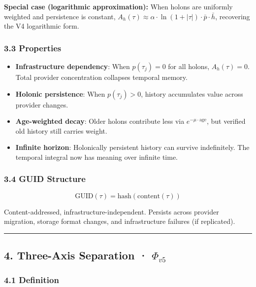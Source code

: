 \documentclass[
  11pt,
]{article}
\providecommand{\tightlist}{%
  \setlength{\itemsep}{0pt}\setlength{\parskip}{0pt}}
\begin{document}
\textbf{Special case (logarithmic approximation):} When holons are
uniformly weighted and persistence is constant,
\(A_h(\tau) \approx \alpha \cdot \ln(1 + |\tau|) \cdot \bar{p} \cdot \bar{h}\),
recovering the V4 logarithmic form.

\subsubsection{3.3 Properties}\label{properties}

\begin{itemize}
\tightlist
\item
  \textbf{Infrastructure dependency}: When \(p(\tau_j) = 0\) for all
  holons, \(A_h(\tau) = 0\). Total provider concentration collapses
  temporal memory.
\item
  \textbf{Holonic persistence}: When \(p(\tau_j) > 0\), history
  accumulates value across provider changes.
\item
  \textbf{Age-weighted decay}: Older holons contribute less via
  \(e^{-\mu \cdot \text{age}}\), but verified old history still carries
  weight.
\item
  \textbf{Infinite horizon}: Holonically persistent history can survive
  indefinitely. The temporal integral now has meaning over infinite
  time.
\end{itemize}

\subsubsection{3.4 GUID Structure}\label{guid-structure}

\[\text{GUID}(\tau) = \text{hash}(\text{content}(\tau))\]

Content-addressed, infrastructure-independent. Persists across provider
migration, storage format changes, and infrastructure failures (if
replicated).

\begin{center}\rule{0.5\linewidth}{0.5pt}\end{center}

\subsection{\texorpdfstring{4. Three-Axis Separation ·
\(\Phi_{v5}\)}{4. Three-Axis Separation · \textbackslash Phi\_\{v5\}}}\label{three-axis-separation-phi_v5}

\subsubsection{4.1 Definition}\label{definition-1}
\end{document}
